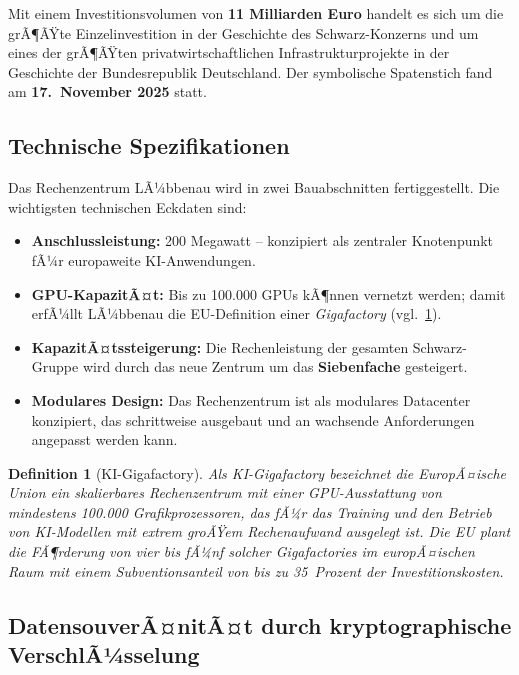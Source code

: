 ﻿\documentclass[12pt, a4paper, openany]{report}
\newtheorem{definition}[theorem]{Definition}
\begin{document}
Mit einem Investitionsvolumen von \textbf{11 Milliarden Euro} handelt es
sich um die grÃ¶ÃŸte Einzelinvestition in der Geschichte des Schwarz-Konzerns
und um eines der grÃ¶ÃŸten privatwirtschaftlichen Infrastrukturprojekte in der
Geschichte der Bundesrepublik Deutschland. Der symbolische Spatenstich fand
am \textbf{17.~November 2025} statt.

\subsection{Technische Spezifikationen}

Das Rechenzentrum LÃ¼bbenau wird in zwei Bauabschnitten fertiggestellt. Die
wichtigsten technischen Eckdaten sind:

\begin{itemize}[leftmargin=2em]
	\item \textbf{Anschlussleistung:} 200 Megawatt -- konzipiert als zentraler
	Knotenpunkt fÃ¼r europaweite KI-Anwendungen.
	\item \textbf{GPU-KapazitÃ¤t:} Bis zu 100.000 GPUs kÃ¶nnen vernetzt werden;
	damit erfÃ¼llt LÃ¼bbenau die EU-Definition einer \emph{Gigafactory}
	(vgl.\ \cref{def:gigafactory}).
	\item \textbf{KapazitÃ¤tssteigerung:} Die Rechenleistung der gesamten
	Schwarz-Gruppe wird durch das neue Zentrum um das \textbf{Siebenfache}
	gesteigert.
	\item \textbf{Modulares Design:} Das Rechenzentrum ist als modulares Data\-center
	konzipiert, das schrittweise ausgebaut und an wachsende Anforderungen
	angepasst werden kann.
\end{itemize}

\begin{definition}[KI-Gigafactory]
	\label{def:gigafactory}
	Als \emph{KI-Gigafactory} bezeichnet die EuropÃ¤ische Union ein
	skalierbares Rechenzentrum mit einer GPU-Ausstattung von mindestens
	100.000 Grafikprozessoren, das fÃ¼r das Training und den Betrieb von
	KI-Modellen mit extrem groÃŸem Rechenaufwand ausgelegt ist. Die EU plant
	die FÃ¶rderung von vier bis fÃ¼nf solcher Gigafactories im europÃ¤ischen Raum
	mit einem Subventionsanteil von bis zu 35~Prozent der Investitionskosten.
\end{definition}

\subsection{DatensouverÃ¤nitÃ¤t durch kryptographische VerschlÃ¼sselung}
\end{document}
